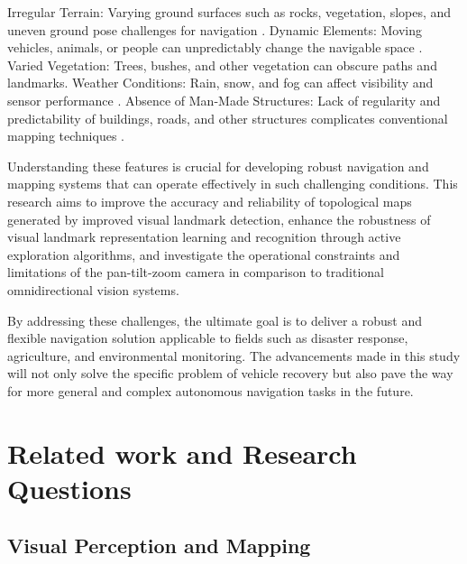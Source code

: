 \documentclass[runningheads]{llncs}
\begin{document}
    Irregular Terrain: Varying ground surfaces such as rocks, vegetation, slopes, and uneven ground pose challenges for navigation \cite{Navigation_Large_Unstructured_environments}.
    Dynamic Elements: Moving vehicles, animals, or people can unpredictably change the navigable space \cite{LocalizabilityPathPlanning}.
    Varied Vegetation: Trees, bushes, and other vegetation can obscure paths and landmarks.
    Weather Conditions: Rain, snow, and fog can affect visibility and sensor performance \cite{LocalizabilityPathPlanning}.
    Absence of Man-Made Structures: Lack of regularity and predictability of buildings, roads, and other structures complicates conventional mapping techniques \cite{LandmarksEffectivenessExperiment}.

Understanding these features is crucial for developing robust navigation and mapping systems that can operate effectively in such challenging conditions. This research aims to improve the accuracy and reliability of topological maps generated by improved visual landmark detection, enhance the robustness of visual landmark representation learning and recognition through active exploration algorithms, and investigate the operational constraints and limitations of the pan-tilt-zoom camera in comparison to traditional omnidirectional vision systems.

By addressing these challenges, the ultimate goal is to deliver a robust and flexible navigation solution applicable to fields such as disaster response, agriculture, and environmental monitoring. The advancements made in this study will not only solve the specific problem of vehicle recovery but also pave the way for more general and complex autonomous navigation tasks in the future.


\section{Related work and Research Questions}


\subsection{Visual Perception and Mapping}

\end{document}
